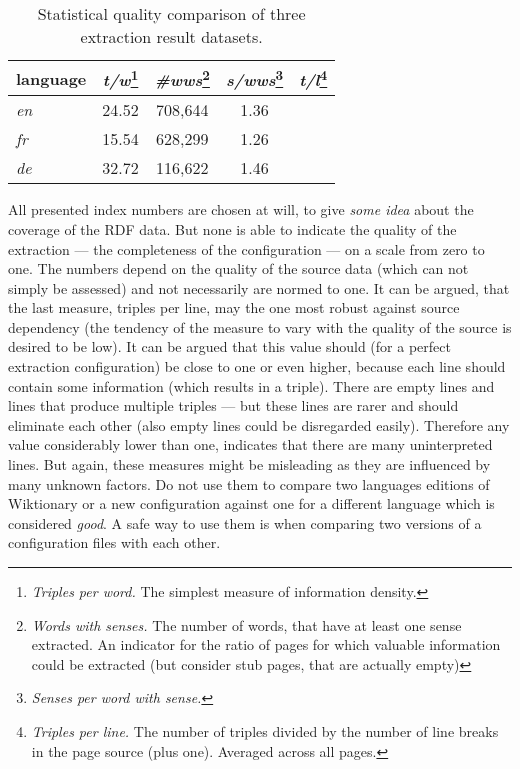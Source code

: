 \begin{table}[h!]
\centering
\caption{Statistical quality comparison of three \wik extraction result datasets.}
\begin{minipage}{\textwidth}
\centering
\begin{tabular}{|l|c|c|c|c|}
\hline language & \emph{t/w}\footnote{\textit{Triples per word.} The simplest measure of information density.} & \emph{\#wws}\footnote{\textit{Words with senses.} The number of words, that have at least one sense  extracted. 
An indicator for the ratio of pages for which valuable information could be extracted (but consider stub pages, that are actually empty)} & \emph{s/wws}\footnote{\textit{Senses per word with sense.}} & \emph{t/l}\footnote{\textit{Triples per line.} The number of triples divided by the number of line breaks in the page source (plus one). Averaged across all pages.} \\
\hline \hline \textit{en} & 24.52 & 708,644 & 1.36 & \\
\hline \textit{fr} & 15.54 & 628,299 & 1.26 & \\ 
\hline \textit{de} & 32.72 & 116,622 & 1.46 & \\ 
\hline 
\end{tabular} 

\end{minipage}

\end{table}

All presented index numbers are chosen at will, to give \textit{some idea} about the coverage of the RDF data.
But none is able to indicate the quality of the extraction --- the completeness of the configuration --- on a scale from zero to one. 
The numbers depend on the quality of the source data (which can not simply be assessed) and not necessarily are normed to one.
It can be argued, that the last measure, triples per line, may the one most robust against source dependency (the tendency of the measure to vary with the quality of the source is desired to be low). 
It can be argued that this value should (for a perfect extraction configuration) be close to one or even higher, because each line should contain some information (which results in a triple). 
There are empty lines and lines that produce multiple triples --- but these lines are rarer and should eliminate each other (also empty lines could be disregarded easily). 
Therefore any value considerably lower than one, indicates that there are many uninterpreted lines. 
But again, these measures might be misleading as they are influenced by many unknown factors. 
Do not use them to compare two languages editions of Wiktionary or a new configuration against one for a different language which is considered \textit{good}.
A safe way to use them is when comparing two versions of a configuration files with each other.

